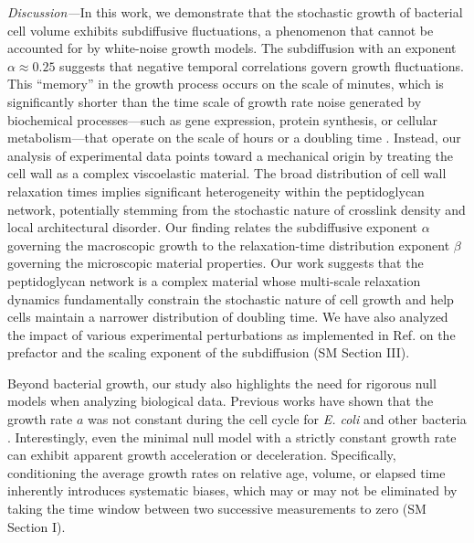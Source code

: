 \documentclass[aps, prl, twocolumn, longbibliography, linenumbers, superscriptaddress]{revtex4-2}
\newcommand{\blue}{\color{blue}}
\begin{document}
{\it Discussion---}In this work, we demonstrate that the stochastic growth of bacterial cell volume exhibits subdiffusive fluctuations, a phenomenon that cannot be accounted for by white-noise growth models. The subdiffusion with an exponent $\alpha \approx 0.25$ suggests that negative temporal correlations govern growth fluctuations. This ``memory'' in the growth process occurs on the scale of minutes, which is significantly shorter than the time scale of growth rate noise generated by biochemical processes—such as gene expression, protein synthesis, or cellular metabolism—that operate on the scale of hours or a doubling time \cite{Kiviet2014stochasticity}. Instead, our analysis of experimental data points toward a mechanical origin by treating the cell wall as a complex viscoelastic material. The broad distribution of cell wall relaxation times implies significant heterogeneity within the peptidoglycan network, potentially stemming from the stochastic nature of crosslink density and local architectural disorder. {\blue Our finding relates the subdiffusive exponent $\alpha$ governing the macroscopic growth to the relaxation-time distribution exponent $\beta$ governing the microscopic material properties}. Our work suggests that the peptidoglycan network is a complex material whose multi-scale relaxation dynamics fundamentally constrain the stochastic nature of cell growth and help cells maintain a narrower distribution of doubling time. {\blue We have also analyzed the impact of various experimental perturbations as implemented in Ref. \cite{Mukherjee2025bacterial} on the prefactor and the scaling exponent of the subdiffusion (SM Section III).}



Beyond bacterial growth, our study also highlights the need for rigorous null models when analyzing biological data. {\blue Previous works have shown that the growth rate $a$ was not constant during the cell cycle for {\it E. coli} and other bacteria \cite{Kar2021distinguishing, Cylke2023super, Cylke2025gene}. Interestingly, even the minimal null model with a strictly constant growth rate can exhibit apparent growth acceleration or deceleration. Specifically, conditioning the average growth rates on relative age, volume, or elapsed time inherently introduces systematic biases, which may or may not be eliminated by taking the time window between two successive measurements to zero (SM Section I).}
\end{document}
